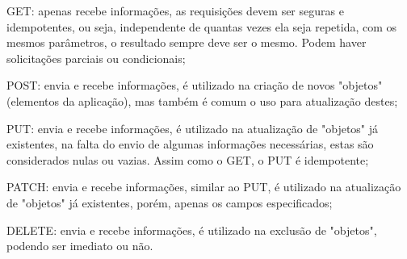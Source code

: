         \begin{alineascomponto}
        	\item GET: apenas recebe informações, as requisições devem ser seguras e idempotentes, ou seja, independente de quantas vezes ela seja repetida, com os mesmos parâmetros, o resultado sempre deve ser o mesmo. Podem haver solicitações parciais ou condicionais;

            \item POST: envia e recebe informações, é utilizado na criação de novos "objetos"\: (elementos da aplicação), mas também é comum o uso para atualização destes;
            
            \item PUT: envia e recebe informações, é utilizado na atualização de "objetos"\: já existentes, na falta do envio de algumas informações necessárias, estas são considerados nulas ou vazias. Assim como o GET, o PUT é idempotente;
            
            \item PATCH: envia e recebe informações, similar ao PUT,  é utilizado na atualização de "objetos"\: já existentes, porém, apenas os campos especificados;

            \item DELETE: envia e recebe informações, é utilizado na exclusão de "objetos", podendo ser imediato ou não.
        \end{alineascomponto}
        
       
        
        \begin{table}[h!]	
        	\centering
        \end{table}

